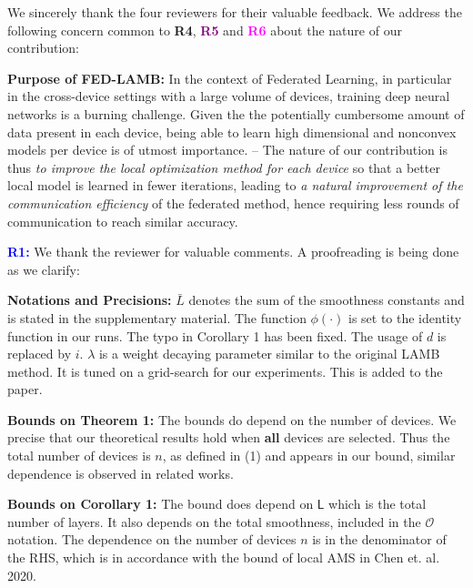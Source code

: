 \documentclass{article}
\begin{document}
We sincerely thank the four reviewers for their valuable feedback. We address the following concern common to \textbf{\textcolor{green!50!black}{R4}}, \textbf{\textcolor{purple}{R5}} and \textbf{\textcolor{magenta}{R6}} about the nature of our contribution:\vspace{-4pt}

\textbf{Purpose of FED-LAMB:} 
In the context of Federated Learning, in particular in the cross-device settings with a large volume of devices, training deep neural networks is a burning challenge.
Given the the potentially cumbersome amount of data present in each device, being able to learn high dimensional and nonconvex models per device is of utmost importance.
-- The nature of our contribution is thus \emph{to improve the local optimization method for each device} so that a better local model is learned in fewer iterations, leading to \emph{a natural improvement of the communication efficiency} of the federated method, hence requiring less rounds of communication to reach similar accuracy.
\vspace{-2pt}

\textbf{\textcolor{blue}{R1:}} We thank the reviewer for valuable comments. A proofreading is being done as we clarify:\vspace{-4pt}


\textbf{Notations and Precisions:} 
$\bar{L}$ denotes the sum of the smoothness constants and is stated in the supplementary material. The function $\phi(\cdot)$ is set to the identity function in our runs. The typo in Corollary 1 has been fixed.
The usage of $d$ is replaced by $i$.
$\lambda$ is a weight decaying parameter similar to the original LAMB method. It is tuned on a grid-search for our experiments. This is added to the paper.

\vspace{-2pt}
\textbf{Bounds on Theorem 1:} The bounds do depend on the number of devices.
We precise that our theoretical results hold when \textbf{all} devices are selected. Thus the total number of devices is $n$, as defined in (1) and appears in our bound, similar dependence is observed in related works.
 
 \vspace{-2pt}
\textbf{Bounds on Corollary 1:} 
The bound does depend on $\mathsf{L}$ which is the total number of layers. 
It also depends on the total smoothness, included in the $\mathcal{O}$ notation.
The dependence on the number of devices $n$ is in the denominator of the RHS, which is in accordance with the bound of local AMS in Chen et. al. 2020.
\end{document}

